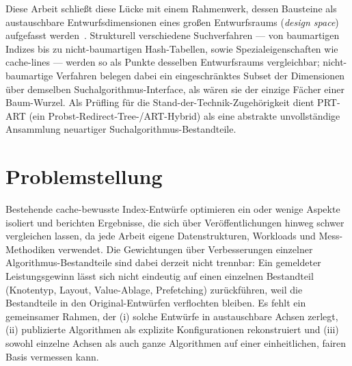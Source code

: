 Diese Arbeit schließt diese Lücke mit einem Rahmenwerk, dessen Bausteine als austauschbare
Entwurfsdimensionen eines großen Entwurfsraums (\emph{design space}) aufgefasst
werden~\cite{idreos2018periodic, idreos2018datacalculator}. Strukturell verschiedene Suchverfahren
--- von baumartigen Indizes bis zu nicht-baumartigen Hash-Tabellen, sowie Spezialeigenschaften wie
cache-lines --- werden so als Punkte desselben Entwurfsraums vergleichbar; nicht-baumartige
Verfahren belegen dabei ein eingeschränktes Subset der Dimensionen über demselben
Suchalgorithmus-Interface, als wären sie der einzige Fächer einer Baum-Wurzel. Als Prüfling für die
Stand-der-Technik-Zugehörigkeit dient PRT-ART (ein Probst-Redirect-Tree-/ART-Hybrid) als eine
abstrakte unvollständige Ansammlung neuartiger Suchalgorithmus-Bestandteile.

\section{Problemstellung}\label{sec:problem}

Bestehende cache-bewusste Index-Entwürfe optimieren ein oder wenige Aspekte isoliert und berichten
Ergebnisse, die sich über Veröffentlichungen hinweg schwer vergleichen lassen, da jede Arbeit eigene
Datenstrukturen, Workloads und Mess-Methodiken verwendet. Die Gewichtungen über Verbesserungen
einzelner Algorithmus-Bestandteile sind dabei derzeit nicht trennbar: Ein gemeldeter Leistungsgewinn
lässt sich nicht eindeutig auf einen einzelnen Bestandteil (Knotentyp, Layout, Value-Ablage,
Prefetching) zurückführen, weil die Bestandteile in den Original-Entwürfen verflochten bleiben. Es
fehlt ein gemeinsamer Rahmen, der (i) solche Entwürfe in austauschbare Achsen zerlegt, (ii)
publizierte Algorithmen als explizite Konfigurationen rekonstruiert und (iii) sowohl einzelne Achsen
als auch ganze Algorithmen auf einer einheitlichen, fairen Basis vermessen kann.

